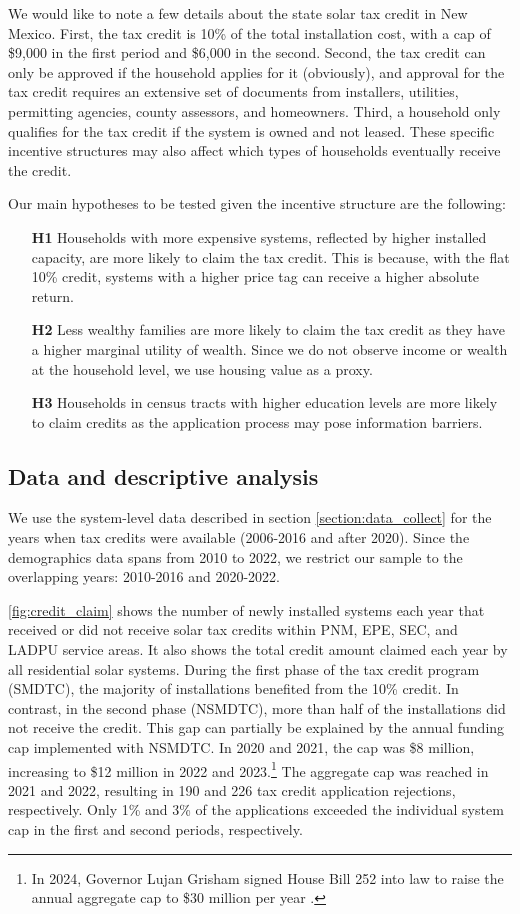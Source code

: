 \documentclass[11pt,twoside,letterpaper]{article}
\begin{document}
We would like to note a few details about the state solar tax credit in New Mexico. First, the tax credit is 10\% of the total installation cost, with a cap of \$9,000 in the first period and \$6,000 in the second. Second, the tax credit can only be approved if the household applies for it (obviously), and approval for the tax credit requires an extensive set of documents from installers, utilities, permitting agencies, county assessors, and homeowners. Third, a household only qualifies for the tax credit if the system is owned and not leased. These specific incentive structures may also affect which types of households eventually receive the credit.

Our main hypotheses to be tested given the incentive structure are the following:
\begin{itemize}
    \item[\textbf{H1}] Households with more expensive systems, reflected by higher installed capacity, are more likely to claim the tax credit. This is because, with the flat 10\% credit, systems with a higher price tag can receive a higher absolute return.
    \item[\textbf{H2}] Less wealthy families are more likely to claim the tax credit as they have a higher marginal utility of wealth. Since we do not observe income or wealth at the household level, we use housing value as a proxy.
    \item[\textbf{H3}] Households in census tracts with higher education levels are more likely to claim credits as the application process may pose information barriers.
\end{itemize}

\subsection{Data and descriptive analysis}

We use the system-level data described in section \ref{section:data_collect} for the years when tax credits were available (2006-2016 and after 2020). Since the demographics data spans from 2010 to 2022, we restrict our sample to the overlapping years: 2010-2016 and 2020-2022. 

\autoref{fig:credit_claim} shows the number of newly installed systems each year that received or did not receive solar tax credits within PNM, EPE, SEC, and LADPU service areas. It also shows the total credit amount claimed each year by all residential solar systems. During the first phase of the tax credit program (SMDTC), the majority of installations benefited from the 10\% credit. In contrast, in the second phase (NSMDTC), more than half of the installations did not receive the credit. This gap can partially be explained by the annual funding cap implemented with NSMDTC. In 2020 and 2021, the cap was \$8 million, increasing to \$12 million in 2022 and 2023.\footnote{In 2024, Governor Lujan Grisham signed House Bill 252 into law to raise the annual aggregate cap to \$30 million per year \parencite{newsolarcap}.} The aggregate cap was reached in 2021 and 2022, resulting in 190 and 226 tax credit application rejections, respectively. Only 1\% and 3\% of the applications exceeded the individual system cap in the first and second periods, respectively.
\end{document}
